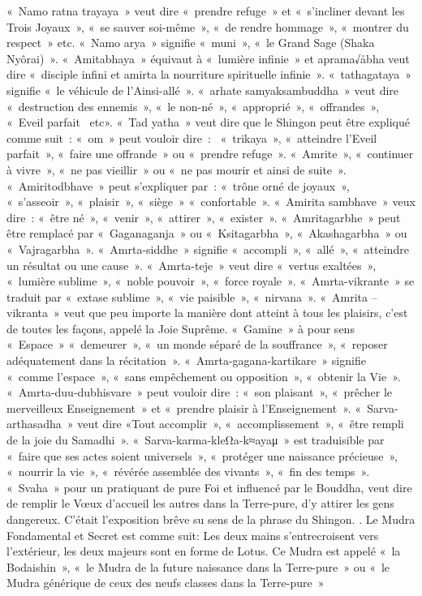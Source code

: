 « Namo ratna trayaya » veut dire « prendre refuge » et « s’incliner devant les Trois Joyaux », « se sauver soi-même », « de rendre hommage », « montrer du respect » etc. « Namo arya » signifie « muni », « le  Grand Sage (Shaka Nyôrai) ».  « Amitabhaya » équivaut à « lumière infinie » et aprama√åbha veut dire « disciple infini et amirta la nourriture spirituelle infinie ».  « tathagataya » signifie « le véhicule de l’Ainsi-allé ». « arhate samyaksambuddha » veut dire « destruction des ennemis », « le non-né », « approprié », « offrandes », « Eveil parfait  etc». « Tad yatha » veut dire que le Shingon peut être expliqué comme suit : « om » peut vouloir dire :   « trikaya », « atteindre l’Eveil parfait », « faire une offrande » ou « prendre refuge ». « Amrite », « continuer à vivre », « ne pas vieillir » ou « ne pas mourir et ainsi de suite ». « Amiritodbhave » peut s’expliquer par :  « trône orné de joyaux », « s’asseoir », « plaisir », « siège » « confortable ». « Amirita sambhave » veux dire :  « être né », « venir », « attirer », « exister ». « Amritagarbhe »  peut être remplacé par « Gaganaganja » ou « Ksitagarbha », « Akashagarbha » ou « Vajragarbha ». « Amrta-siddhe » signifie « accompli », « allé », « atteindre un résultat ou une cause ». « Amrta-teje » veut dire « vertus exaltées », « lumière sublime », « noble pouvoir », « force royale ». « Amrta-vikrante » se traduit par « extase sublime », « vie paisible »,  « nirvana ». « Amrita –vikranta » veut que peu importe la manière dont atteint à tous les plaisirs, c’est de toutes les façons, appelé la Joie Suprême. « Gamine » à pour sens « Espace » « demeurer », « un monde séparé de la souffrance », « reposer adéquatement dans la récitation ». « Amrta-gagana-kartikare » signifie « comme l’espace », « sans empêchement ou opposition », « obtenir la Vie ». « Amrta-duu-dubhisvare » peut vouloir dire : « son plaisant », « prêcher le merveilleux Enseignement » et « prendre plaisir à l’Enseignement ». « Sarva-arthasadha » veut dire «Tout accomplir », « accomplissement », « être rempli de la joie du Samadhi ». « Sarva-karma-kleΩa-k≈ayaμ » est traduisible par « faire que ses actes soient universels », « protéger une naissance précieuse », « nourrir la vie », « révérée assemblée des vivants », « fin des temps ». « Svaha » pour un pratiquant de pure Foi et influencé par le Bouddha, veut dire de remplir le Vœux d’accueil les autres dans la Terre-pure, d’y attirer les gens dangereux. C’était l’exposition brêve su sens de la phrase du Shingon.
.
Le Mudra Fondamental et Secret est comme suit: Les deux mains s’entrecroisent vers l’extérieur, les deux majeurs sont en forme de Lotus. Ce Mudra est appelé « la Bodaishin »,  « le Mudra de la future naissance dans la Terre-pure » ou « le Mudra générique de ceux des neufs classes dans la Terre-pure »

